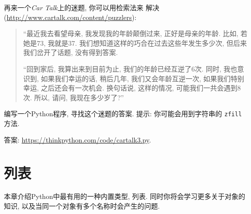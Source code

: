 \documentclass[10pt]{book}
\begin{document}
\begin{exercise}
再来一个{\em Car Talk}上的迷题, 你可以用检索法来
解决(\url{http://www.cartalk.com/content/puzzlers}):

\begin{quote}
%
``最近我去看望母亲, 我发现我的年龄颠倒过来, 正好是母亲的年龄. 
比如, 若她是73, 我就是37. 我们想知道这样的巧合在过去这些年发生多少次, 
但后来我们岔开了话题, 没有得到答案. 

``回到家后, 我算出来到目前为止, 我们的年龄已经互逆了6次. 
同时, 我也意识到, 如果我们幸运的话, 稍后几年, 我们又会年龄互逆一次, 
如果我们特别幸运, 之后还会有一次机会. 换句话说, 这样的情况, 
可能我们一共会遇到8次. 所以, 请问, 我现在多少岁了?''

\end{quote}

%
编写一个Python程序, 寻找这个迷题的答案. 
提示: 你可能会用到字符串的 {\tt zfill} 方法. 

答案: \url{https://thinkpython.com/code/cartalk3.py}.

\end{exercise}


\chapter{列表}

本章介绍Python中最有用的一种内置类型, 列表. 
同时你将会学习更多关于对象的知识, 
以及当同一个对象有多个名称时会产生的问题. 
\end{document}
